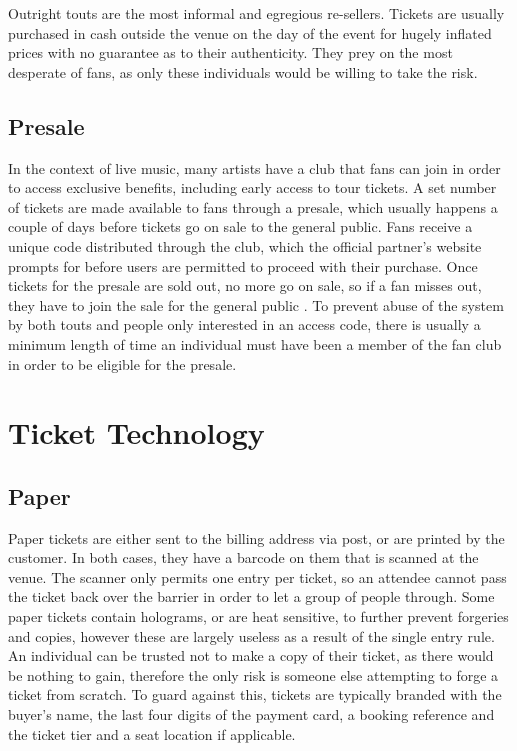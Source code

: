 \documentclass[12pt]{bhamdissertation}
\begin{document}
Outright touts are the most informal and egregious re-sellers. Tickets are usually purchased in cash outside the venue on the day of the event for hugely inflated prices with no guarantee as to their authenticity. They prey on the most desperate of fans, as only these individuals would be willing to take the risk.

\subsection{Presale}

In the context of live music, many artists have a club that fans can join in order to access exclusive benefits, including early access to tour tickets. A set number of tickets are made available to fans through a presale, which usually happens a couple of days before tickets go on sale to the general public. Fans receive a unique code distributed through the club, which the official partner's website prompts for before users are permitted to proceed with their purchase. Once tickets for the presale are sold out, no more go on sale, so if a fan misses out, they have to join the sale for the general public \autocite{T16}. To prevent abuse of the system by both touts and people only interested in an access code, there is usually a minimum length of time an individual must have been a member of the fan club in order to be eligible for the presale.

\section{Ticket Technology}

\subsection{Paper}

Paper tickets are either sent to the billing address via post, or are printed by the customer. In both cases, they have a barcode on them that is scanned at the venue. The scanner only permits one entry per ticket, so an attendee cannot pass the ticket back over the barrier in order to let a group of people through. Some paper tickets contain holograms, or are heat sensitive, to further prevent forgeries and copies, however these are largely useless as a result of the single entry rule. An individual can be trusted not to make a copy of their ticket, as there would be nothing to gain, therefore the only risk is someone else attempting to forge a ticket from scratch. To guard against this, tickets are typically branded with the buyer's name, the last four digits of the payment card, a booking reference and the ticket tier and a seat location if applicable.
\end{document}
